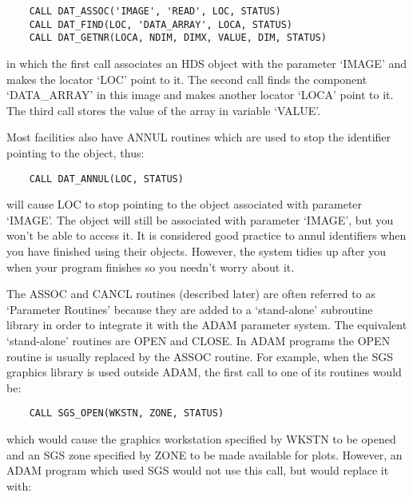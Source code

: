 \begin{small}
\begin{verbatim}
    CALL DAT_ASSOC('IMAGE', 'READ', LOC, STATUS)
    CALL DAT_FIND(LOC, 'DATA_ARRAY', LOCA, STATUS)
    CALL DAT_GETNR(LOCA, NDIM, DIMX, VALUE, DIM, STATUS)
\end{verbatim}
\end{small}

in which the first call associates an HDS object with the parameter `IMAGE'
and makes the locator `LOC' point to it.
The second call finds the component `DATA\_ARRAY' in this image and makes
another locator `LOCA' point to it.
The third call stores the value of the array in variable `VALUE'.

Most facilities also have ANNUL routines which are used to stop the identifier
pointing to the object, thus:

\begin{small}
\begin{verbatim}
    CALL DAT_ANNUL(LOC, STATUS)
\end{verbatim}
\end{small}

will cause LOC to stop pointing to the object associated with parameter `IMAGE'.
The object will still be associated with parameter `IMAGE', but you won't be
able to access it.
It is considered good practice to annul identifiers when you have finished
using their objects.
However, the system tidies up after you when your program finishes so you
needn't worry about it.

The ASSOC and CANCL routines (described later) are often referred to as
`Parameter Routines' because they are added to a `stand-alone' subroutine
library in order to integrate it with the ADAM parameter system.
The equivalent `stand-alone' routines are OPEN and CLOSE.
In ADAM programs the OPEN routine is usually replaced by the ASSOC routine.
For example, when the SGS graphics library is used outside ADAM, the first
call to one of its routines would be:

\begin{small}
\begin{verbatim}
    CALL SGS_OPEN(WKSTN, ZONE, STATUS)
\end{verbatim}
\end{small}

which would cause the graphics workstation specified by WKSTN to be opened and
an SGS zone specified by ZONE to be made available for plots.
However, an ADAM program which used SGS would not use this call, but would
replace it with:

